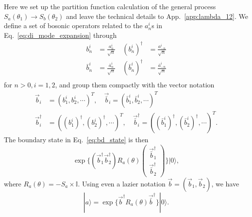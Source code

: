 Here we set up the partition function calculation of the general process $S_a( \theta_1 ) \rightarrow S_b( \theta_2)$ and leave the technical details to App.~\ref{app:lambda_12}. We define a set of bosonic operators related to the $a^i_n$s in Eq.~\eqref{eq:di_mode_expansion} through
\begin{equation}
\begin{aligned}
b^i_n &= \frac{a^i_n}{\sqrt{n}} \quad (b^i_n)^{\dagger} &= \frac{a^i_{-n}}{\sqrt{n}} \\
\bar{b}^i_n &= \frac{\bar{a}^i_n}{\sqrt{n}} \quad (\bar{b}^i_n)^{\dagger} &= \frac{\bar{a}^i_{-n}}{\sqrt{n}} \\
\end{aligned}
\end{equation}
for $n > 0 , i = 1, 2$, and group them compactly with the vector notation
\begin{equation}
\begin{aligned}
\vec{b}_i &= ( b^i_1, b^i_2, \cdots )^T, \quad \vec{\bar{b}}_i = ( \bar{b}^i_1, \bar{b}^i_2, \cdots )^T\\
\vec{b}^\dagger_i &= ( (b^i_1)^\dagger, (b^i_2)^\dagger, \cdots )^T, \quad\vec{\bar{b}}^{\dagger}_i = ( (\bar{b}^i_1)^\dagger, (\bar{b}^i_2)^\dagger, \cdots )^T .
\end{aligned}
\end{equation}
The boundary state in Eq.~\eqref{eq:bd_state} is then 
\begin{equation}
\exp\Big\{  (\vec{b}_1^{\dagger} \vec{b}_2^{\dagger} ) R_a( \theta )   
\begin{pmatrix}
  \vec{\bar{b}}_1^{\dagger}\\
  \vec{\bar{b}}_2^{\dagger}
\end{pmatrix}\Big\}  |0  \rangle ,
\end{equation}
where $R_a( \theta ) = -S_a \times \mathbb{I}$. Using even a lazier notation $\vec{b} = ( \vec{b}_1, \vec{b}_2 )$, we have
\begin{equation}
|a \rangle = \exp\Big\{  \vec{b}^{\dagger} R_a( \theta )    \vec{\bar{b}}^{\dagger} \Big\} |0 \rangle .
\end{equation}


